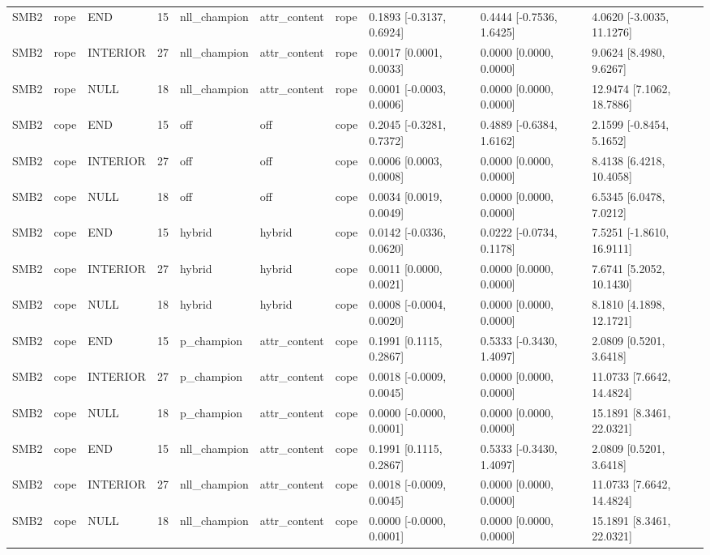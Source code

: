 \begin{tabular}{llllllllll}
SMB2 & rope & END & 15 & nll\_champion & attr\_content & rope & 0.1893 [-0.3137, 0.6924] & 0.4444 [-0.7536, 1.6425] & 4.0620 [-3.0035, 11.1276] \\
SMB2 & rope & INTERIOR & 27 & nll\_champion & attr\_content & rope & 0.0017 [0.0001, 0.0033] & 0.0000 [0.0000, 0.0000] & 9.0624 [8.4980, 9.6267] \\
SMB2 & rope & NULL & 18 & nll\_champion & attr\_content & rope & 0.0001 [-0.0003, 0.0006] & 0.0000 [0.0000, 0.0000] & 12.9474 [7.1062, 18.7886] \\
SMB2 & cope & END & 15 & off & off & cope & 0.2045 [-0.3281, 0.7372] & 0.4889 [-0.6384, 1.6162] & 2.1599 [-0.8454, 5.1652] \\
SMB2 & cope & INTERIOR & 27 & off & off & cope & 0.0006 [0.0003, 0.0008] & 0.0000 [0.0000, 0.0000] & 8.4138 [6.4218, 10.4058] \\
SMB2 & cope & NULL & 18 & off & off & cope & 0.0034 [0.0019, 0.0049] & 0.0000 [0.0000, 0.0000] & 6.5345 [6.0478, 7.0212] \\
SMB2 & cope & END & 15 & hybrid & hybrid & cope & 0.0142 [-0.0336, 0.0620] & 0.0222 [-0.0734, 0.1178] & 7.5251 [-1.8610, 16.9111] \\
SMB2 & cope & INTERIOR & 27 & hybrid & hybrid & cope & 0.0011 [0.0000, 0.0021] & 0.0000 [0.0000, 0.0000] & 7.6741 [5.2052, 10.1430] \\
SMB2 & cope & NULL & 18 & hybrid & hybrid & cope & 0.0008 [-0.0004, 0.0020] & 0.0000 [0.0000, 0.0000] & 8.1810 [4.1898, 12.1721] \\
SMB2 & cope & END & 15 & p\_champion & attr\_content & cope & 0.1991 [0.1115, 0.2867] & 0.5333 [-0.3430, 1.4097] & 2.0809 [0.5201, 3.6418] \\
SMB2 & cope & INTERIOR & 27 & p\_champion & attr\_content & cope & 0.0018 [-0.0009, 0.0045] & 0.0000 [0.0000, 0.0000] & 11.0733 [7.6642, 14.4824] \\
SMB2 & cope & NULL & 18 & p\_champion & attr\_content & cope & 0.0000 [-0.0000, 0.0001] & 0.0000 [0.0000, 0.0000] & 15.1891 [8.3461, 22.0321] \\
SMB2 & cope & END & 15 & nll\_champion & attr\_content & cope & 0.1991 [0.1115, 0.2867] & 0.5333 [-0.3430, 1.4097] & 2.0809 [0.5201, 3.6418] \\
SMB2 & cope & INTERIOR & 27 & nll\_champion & attr\_content & cope & 0.0018 [-0.0009, 0.0045] & 0.0000 [0.0000, 0.0000] & 11.0733 [7.6642, 14.4824] \\
SMB2 & cope & NULL & 18 & nll\_champion & attr\_content & cope & 0.0000 [-0.0000, 0.0001] & 0.0000 [0.0000, 0.0000] & 15.1891 [8.3461, 22.0321] \\

\end{tabular}
